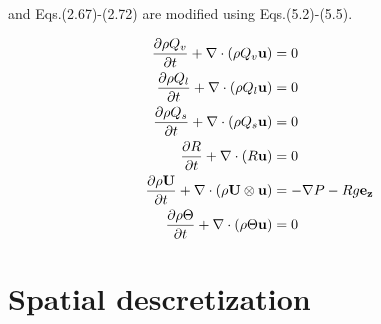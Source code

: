 and Eqs.(2.67)-(2.72) are modified using Eqs.(5.2)-(5.5).

\begin{align}
 \frac{\partial \rho Q_v     }{\partial t} + \nabla \cdot \left( \rho Q_v             {\bf u}\right) &= 0 \\
 \frac{\partial \rho Q_l     }{\partial t} + \nabla \cdot \left( \rho Q_l             {\bf u}\right) &= 0 \\
 \frac{\partial \rho Q_s     }{\partial t} + \nabla \cdot \left( \rho Q_s             {\bf u}\right) &= 0 \\
 \frac{\partial R            }{\partial t} + \nabla \cdot \left( R                    {\bf u}\right) &= 0 \\
 \frac{\partial \rho {\bf U} }{\partial t} + \nabla \cdot \left( \rho {\bf U} \otimes {\bf u}\right) &= -\nabla P - Rg {\bf e_z} \\
 \frac{\partial \rho \Theta  }{\partial t} + \nabla \cdot \left( \rho \Theta          {\bf u}\right) &= 0
\end{align}

\section{Spatial descretization}

